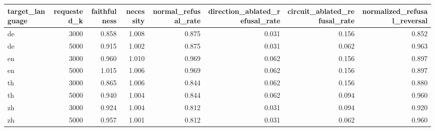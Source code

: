 \begin{tabular}{lrrrrrrr}
\toprule
target\_language & requested\_k & faithfulness & necessity & normal\_refusal\_rate & direction\_ablated\_refusal\_rate & circuit\_ablated\_refusal\_rate & normalized\_refusal\_reversal \\
\midrule
de & 3000 & 0.858 & 1.008 & 0.875 & 0.031 & 0.156 & 0.852 \\
de & 5000 & 0.915 & 1.002 & 0.875 & 0.031 & 0.062 & 0.963 \\
en & 3000 & 0.960 & 1.010 & 0.969 & 0.062 & 0.156 & 0.897 \\
en & 5000 & 1.015 & 1.006 & 0.969 & 0.062 & 0.156 & 0.897 \\
th & 3000 & 0.865 & 1.006 & 0.844 & 0.062 & 0.156 & 0.880 \\
th & 5000 & 0.940 & 1.004 & 0.844 & 0.062 & 0.094 & 0.960 \\
zh & 3000 & 0.924 & 1.004 & 0.812 & 0.031 & 0.094 & 0.920 \\
zh & 5000 & 0.957 & 1.001 & 0.812 & 0.031 & 0.062 & 0.960 \\
\bottomrule
\end{tabular}
